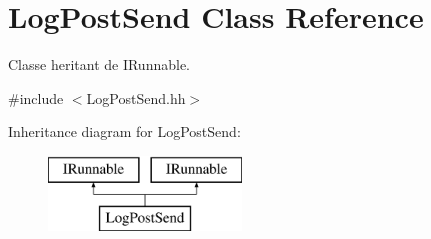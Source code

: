 \hypertarget{class_log_post_send}{}\section{Log\+Post\+Send Class Reference}
\label{class_log_post_send}


Classe heritant de I\+Runnable.  




{\ttfamily \#include $<$Log\+Post\+Send.\+hh$>$}

Inheritance diagram for Log\+Post\+Send\+:\begin{figure}[H]
\begin{center}
\leavevmode
\includegraphics[height=2.000000cm]{class_log_post_send}
\end{center}
\end{figure}
